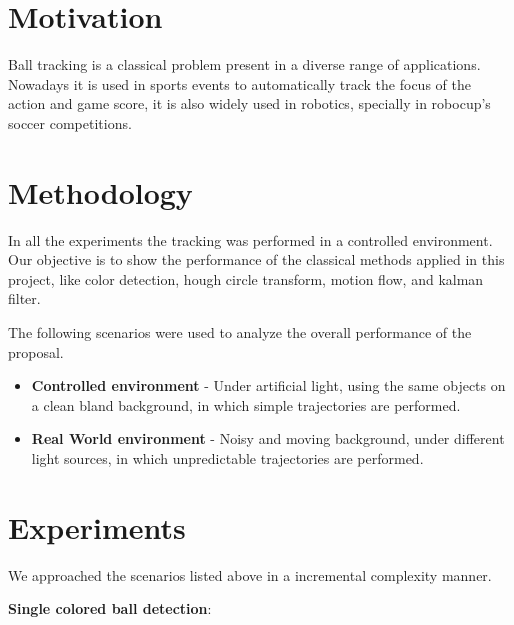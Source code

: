 \documentclass{sciposter}
\begin{document}
\begin{multicols}{3}


\section{Motivation}

Ball tracking is a classical problem present in a diverse range of applications. Nowadays it is used in sports events to automatically track the focus of the action and game score, it is also widely used in robotics, specially in robocup's soccer competitions.

\section{Methodology}

In all the experiments the tracking was performed in a controlled environment. Our objective is to show the performance of the classical methods applied in this project, like color detection, hough circle transform, motion flow, and kalman filter.

\bigbreak

The following scenarios were used to analyze the overall performance of the proposal.

\begin{itemize}

\item \textbf{Controlled environment} - Under artificial light, using the same objects on a clean bland background, in which simple trajectories are performed.
\item \textbf{Real World environment} - Noisy and moving background, under different light sources, in which unpredictable trajectories are performed.  

\end{itemize}

\section{Experiments}

We approached the scenarios listed above in a incremental complexity manner.

\bigbreak
\textbf{Single colored ball detection}:


\end{multicols}
\end{document}
